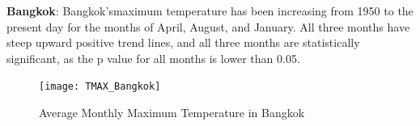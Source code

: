 \textbf{Bangkok}: Bangkok'smaximum temperature has been increasing from 1950 to the present day for the months of April, August, and January. All three months have steep upward positive trend lines, and all three months are statistically significant, as the p value for all months is lower than 0.05.

\begin{figure}[h!]
  \centering
  \texttt{[image: TMAX\_Bangkok]}
  \caption{Average Monthly Maximum Temperature in Bangkok}
  \label{fig:TMAX_bangkok}
\end{figure}












